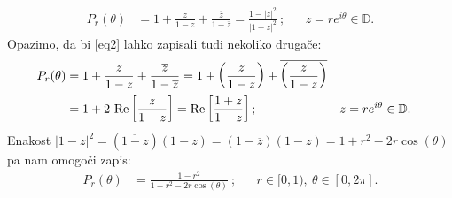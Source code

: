 \documentclass[mat1]{fmfdelo}
\begin{document}
    \begin{align}
        \label{eq2}
        P_r(\theta) &= 1 + \frac{z}{1 - z}+ \frac{\overline{z}}{1 - \overline{z}} = \frac{1 - |z|^2}{|1-z|^2}~;& &z = r e^{i\theta} \in \mathbb{D}.
    \end{align}
    Opazimo, da bi \eqref{eq2} lahko zapisali tudi nekoliko drugače:
    \begin{align}
        \label{eq3}
        P_r(\theta) &= 1 + \frac{z}{1 - z}+ \frac{\overline{z}}{1 - \overline{z}} = 1 + \left(\frac{z}{1 - z} \right)+ \overline{\left(\frac{z}{1 - z}\right)} \notag \\
        &= 1 + 2~\text{Re}\left[\frac{z}{1-z}\right] =\text{Re}\left[\frac{1 + z}{1-z}\right]; & &z = r e^{i\theta} \in \mathbb{D}.
    \end{align}
    Enakost $|1 - z|^2 = (\overline{1 - z})(1 - z) = (1 - \overline{z})(1 - z) = 1 + r^2 - 2r \cos(\theta)$ pa nam omogoči zapis:
    \begin{align}
        \label{eq4}
        P_r(\theta) & = \frac{1-r^2}{1+ r^2 - 2r \cos(\theta)}~; & &r \in [0,1),~\theta \in [0,2\pi].
    \end{align}
\end{document}

